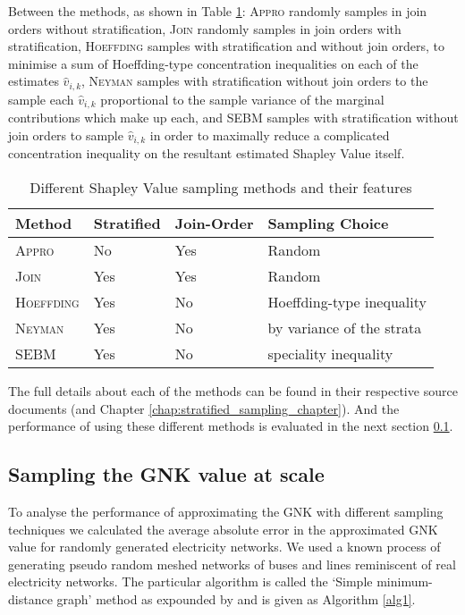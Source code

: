 Between the methods, as shown in Table \ref{table:stratified_sampling_methods}: \textsc{Appro} randomly samples in join orders without stratification, \textsc{Join} randomly samples in join orders with stratification, \textsc{Hoeffding} samples with stratification and without join orders, to minimise a sum of Hoeffding-type concentration inequalities on each of the estimates $\hat{v}_{i,k}$,
\textsc{Neyman} samples with stratification without join orders to the sample each $\hat{v}_{i,k}$ proportional to the sample variance of the marginal contributions which make up each,
and \textsc{SEBM} samples with stratification without join orders to sample $\hat{v}_{i,k}$ in order to maximally reduce a complicated concentration inequality on the resultant estimated Shapley Value itself.

\begin{table}[]
\centering
\begin{tabular}{|l|l|l|l|}
\hline
Method & Stratified & Join-Order & Sampling Choice \\ \hline
\textsc{Appro} & No & Yes & Random\\
\textsc{Join} & Yes & Yes & Random\\
\textsc{Hoeffding} & Yes & No & Hoeffding-type inequality \\
\textsc{Neyman} & Yes & No & by variance of the strata \\
\textsc{SEBM} & Yes & No & speciality inequality\\ \hline
\end{tabular}
\caption{Different Shapley Value sampling methods and their features}
\label{table:stratified_sampling_methods}
\end{table}

The full details about each of the methods can be found in their respective source documents \citep{CASTRO2017180,2013arXiv1306.4265M,DBLP:journals/cor/CastroGT09} (and Chapter \ref{chap:stratified_sampling_chapter}).
And the performance of using these different methods is evaluated in the next section \ref{section:performance}.

\subsection{Sampling the GNK value at scale}\label{section:performance}

To analyse the performance of approximating the GNK with different sampling techniques we calculated the average absolute error in the approximated GNK value for randomly generated electricity networks.
We used a known process of generating pseudo random meshed networks of buses and lines reminiscent of real electricity networks. The particular algorithm is called the `Simple minimum-distance graph' method as expounded by \cite{hines1} and is given as Algorithm \ref{alg1}.

